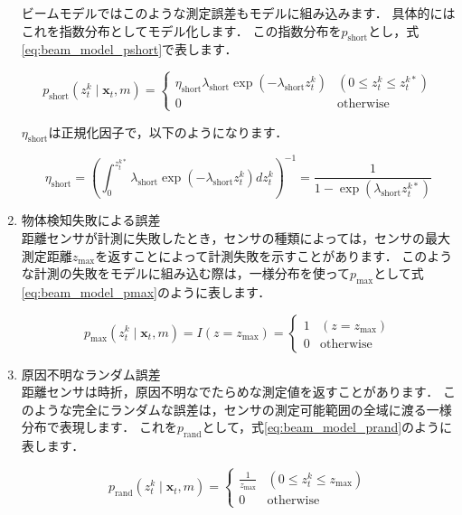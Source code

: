 \documentclass[{../../master}]{subfiles}
\begin{document}
\begin{enumerate}
  ビームモデルではこのような測定誤差もモデルに組み込みます．
  具体的にはこれを指数分布としてモデル化します．
  この指数分布を$p_{\text{short}}$とし，式\ref{eq:beam_model_pshort}で表します．

  \begin{equation}
    p_{\text{short}}(z^{k}_{t} \mid \bm{x}_{t}, m) =
    \begin{cases}
      \eta_{\text{short}}\lambda_{\text{short}}\exp{(-\lambda_{\text{short}}z^{k}_{t})} & (0 \leq z^{k}_{t} \leq z^{k*}_{t}) \\
      0 & \text{otherwise}
    \end{cases}
    \label{eq:beam_model_pshort}
  \end{equation}

  $\eta_{\text{short}}$は正規化因子で，以下のようになります．

  \begin{equation}
    \eta_{\text{short}} = \left( \int^{z^{k*}_{t}}_{0} \lambda_{\text{short}}\exp{(-\lambda_{\text{short}}z^{k}_{t})} dz^{k}_{t} \right)^{-1}
    = \frac{1}{1 - \exp{(\lambda_{\text{short}}z^{k*}_{t})}}
  \end{equation}

  \item 物体検知失敗による誤差 \\
  距離センサが計測に失敗したとき，センサの種類によっては，センサの最大測定距離$z_{\text{max}}$を返すことによって計測失敗を示すことがあります．
  このような計測の失敗をモデルに組み込む際は，一様分布を使って$p_{\text{max}}$として式\ref{eq:beam_model_pmax}のように表します．

  \begin{equation}
    p_{\text{max}}(z^{k}_{t} \mid \bm{x}_{t}, m) = I(z = z_{\text{max}}) =
    \begin{cases}
      1 & (z = z_{\text{max}}) \\
      0 & \text{otherwise}
    \end{cases}
    \label{eq:beam_model_pmax}
  \end{equation}

  \item 原因不明なランダム誤差 \\
  距離センサは時折，原因不明なでたらめな測定値を返すことがあります．
  このような完全にランダムな誤差は，センサの測定可能範囲の全域に渡る一様分布で表現します．
  これを$p_{\text{rand}}$として，式\ref{eq:beam_model_prand}のように表します．

  \begin{equation}
    p_{\text{rand}}(z^{k}_{t} \mid \bm{x}_{t}, m) =
    \begin{cases}
      \frac{1}{z_{\text{max}}} & (0 \leq z^{k}_{t} \leq z_{\text{max}}) \\
      0 & \text{otherwise}
    \end{cases}
    \label{eq:beam_model_prand}
  \end{equation}
\end{enumerate}
\end{document}

